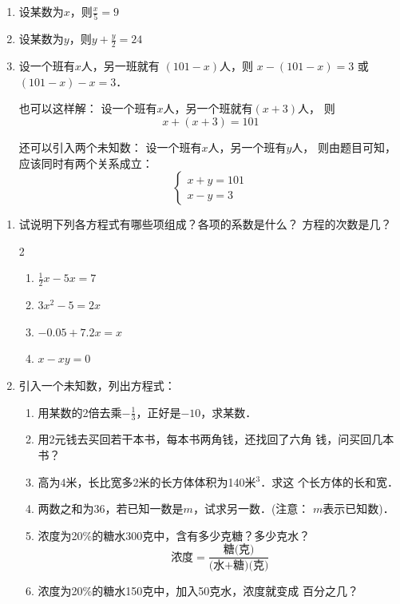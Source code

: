 \begin{solution}
\begin{enumerate}
    \item 设某数为$x$，则$\frac{x}{5}=9$
    \item 设某数为$y$，则$y+\frac{y}{2}=24$
    \item 设一个班有$x$人，另一班就有
  $(101-x)$人，则  $x-(101-x)=3$ 或   $(101-x)-x=3$．

也可以这样解：    设一个班有$x$人，另一个班就有$(x+3)$人，
      则$$x+(x+3)=101$$
      
还可以引入两个未知数：
    设一个班有$x$人，另一个班有$y$人，
则由题目可知，应该同时有两个关系成立：
\[\begin{cases}
    x+y=101\\
    x-y=3
\end{cases}\]
\end{enumerate}    
\end{solution}


\begin{ex}
\begin{enumerate}
    \item 试说明下列各方程式有哪些项组成？各项的系数是什么？
    方程的次数是几？
    \begin{multicols}{2}
        \begin{enumerate}
 \item $\frac{1}{2}x-5x=7$
 \item $3x^2-5=2x$
 \item $-0.05+7.2x=x$
 \item $x-xy=0$           
        \end{enumerate}
    \end{multicols}

\item 引入一个未知数，列出方程式：
\begin{enumerate}
    \item 用某数的2倍去乘$-\frac{1}{3}$，正好是$-10$，求某数．
    \item 用2元钱去买回若干本书，每本书两角钱，还找回了六角
  钱，问买回几本书？
  \item 高为4米，长比宽多2米的长方体体积为140米$^3$．求这
  个长方体的长和宽．
  \item 两数之和为36，若已知一数是$m$，试求另一数．(注意：
  $m$表示已知数)．
  \item 浓度为20\%的糖水300克中，含有多少克糖？多少克水？
  \[\text{浓度}=\frac{\text{糖(克)}}{\text{(水+糖)(克)}}\]
  \item 浓度为20\%的糖水150克中，加入50克水，浓度就变成
  百分之几？
\end{enumerate}
\end{enumerate}
\end{ex}

